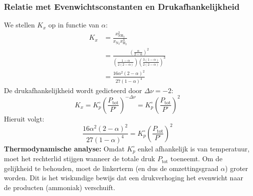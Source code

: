 \documentclass[11pt,a4paper]{article}
\begin{document}
\subsubsection{Relatie met Evenwichtsconstanten en Drukafhankelijkheid}
We stellen $K_x$ op in functie van $\alpha$:
\begin{align}
    K_x &= \frac{x_{\text{NH}_3}^2}{x_{\text{N}_2} x_{\text{H}_2}^3} \\
        &= \frac{\left( \frac{\alpha}{2-\alpha} \right)^2}{\left( \frac{1-\alpha}{2(2-\alpha)} \right) \left( \frac{3(1-\alpha)}{2(2-\alpha)} \right)^3} \\
        &= \frac{16 \alpha^2 (2-\alpha)^2}{27 (1-\alpha)^4}
\end{align}
De drukafhankelijkheid wordt gedicteerd door $\Delta \nu = -2$:
\begin{equation}
    K_x = K_p^\circ \left( \frac{P_{\text{tot}}}{P^\circ} \right)^{-\Delta \nu} = K_p^\circ \left( \frac{P_{\text{tot}}}{P^\circ} \right)^2
\end{equation}
Hieruit volgt:
\begin{equation}
    \frac{16 \alpha^2 (2-\alpha)^2}{27 (1-\alpha)^4} = K_p^\circ \left( \frac{P_{\text{tot}}}{P^\circ} \right)^2
\end{equation}
\textbf{Thermodynamische analyse:}
Omdat $K_p^\circ$ enkel afhankelijk is van temperatuur, moet het rechterlid stijgen wanneer de totale druk $P_{\text{tot}}$ toeneemt. Om de gelijkheid te behouden, moet de linkerterm (en dus de omzettingsgraad $\alpha$) groter worden. Dit is het wiskundige bewijs dat een drukverhoging het evenwicht naar de producten (ammoniak) verschuift.
\end{document}
